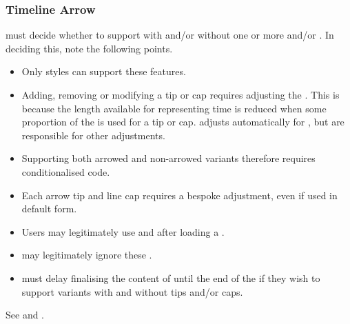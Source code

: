 \documentclass[10pt,british,a4paper]{ltxdoc}
\begin{document}
\subsubsection{Timeline Arrow}\label{subsubsec:timeline-arrow}

\Chronosstyleslabelname{} must decide whether to support  with and/or without one or more 
 and/or .
In deciding this, note the following points.
\begin{itemize}
  \item Only  styles can support these features.
  \item Adding, removing or modifying a tip or cap requires adjusting the .
  This is because the length available for representing time is reduced when some proportion of the  is used for a tip or cap.
   adjusts automatically for , but \styleslabelname{} are responsible for other adjustments.
  \item Supporting both arrowed and non-arrowed variants therefore requires conditionalised code.
  \item Each arrow tip and line cap requires a bespoke adjustment, even if used in default form.
  \item Users may legitimately use  and  after loading a \chronosstylelabelname{}.
  \item \Chronosstyleslabelname{} may legitimately ignore these \keyslabelname{}.
  \item \Chronosstyleslabelname{} must delay finalising the content of  until the end of the  if they wish to support variants with and without tips and/or caps.
\end{itemize}

See  and .
\end{document}
